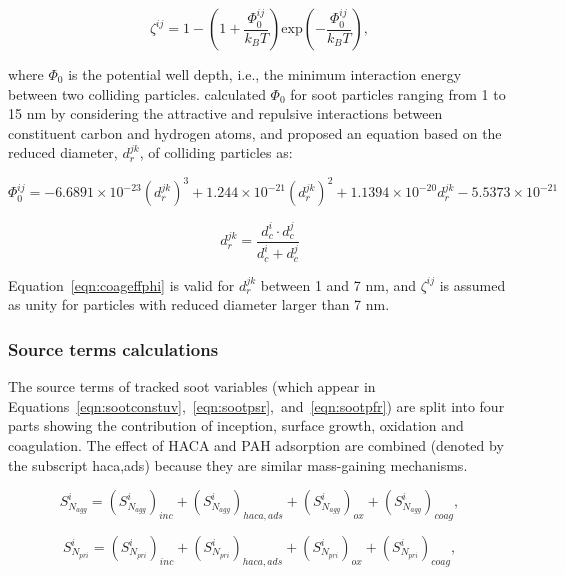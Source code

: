 \begin{equation}
	\zeta^{ij} = 1 - 
	\left(1 + \frac{\Phi^{ij}_0}{k_BT} \right)
	\mathrm{exp}\left(-\frac{\Phi^{ij}_0}{k_BT}\right),
	\label{eqn:coageff}
\end{equation}

\noindent where $\Phi_0$ is the potential well depth, i.e., the minimum interaction energy between two colliding particles. \citet{hou2020coagulation} calculated $\Phi_0$ for soot particles ranging from 1 to 15 nm by considering the attractive and repulsive interactions between constituent carbon and hydrogen atoms, and proposed an equation based on the reduced diameter, $d^{jk}_r$, of colliding particles as:

\begin{equation}
	\Phi^{ij}_0 = -6.6891\times10^{-23} (d^{jk}_r)^3 + 1.244\times10^{-21} (d^{jk}_r)^2 + 1.1394\times10^{-20} d^{jk}_r - 5.5373\times10^{-21}
	\label{eqn:coageffphi}
\end{equation}

\begin{equation}
	d^{jk}_r = \frac{d^i_c\cdot d^j_c}{d^i_c+d^j_c}
	\label{eqn:coageffredcueddia}
\end{equation}

Equation~\eqref{eqn:coageffphi} is valid for $d^{jk}_r$ between 1 and 7 nm, and $\zeta^{ij}$ is assumed as unity for particles with reduced diameter larger than 7 nm.

\subsubsection{Source terms calculations}

The source terms of tracked soot variables (which appear in Equations~\ref{eqn:sootconstuv},~\ref{eqn:sootpsr},~and~\ref{eqn:sootpfr}) are split into four parts showing the contribution of inception, surface growth, oxidation and coagulation. The effect of HACA and PAH adsorption are combined (denoted by the subscript haca,ads) because they are similar mass-gaining mechanisms.

\begin{equation}
	S^i_{N_{agg}} = 
	\left(S^i_{N_{agg}}\right)_{inc}
	+\left(S^i_{N_{agg}}\right)_{haca, ads}
	+\left(S^i_{N_{agg}}\right)_{ox}
	+\left(S^i_{N_{agg}}\right)_{coag}
	\label{eqn:S_Naggsect},
\end{equation}

\begin{equation}
	S^i_{N_{pri}} = 
	\left(S^i_{N_{pri}}\right)_{inc}
	+\left(S^i_{N_{pri}}\right)_{haca, ads}
	+\left(S^i_{N_{pri}}\right)_{ox}
	+\left(S^i_{N_{pri}}\right)_{coag}
	\label{eqn:S_Nprisect},
\end{equation}

